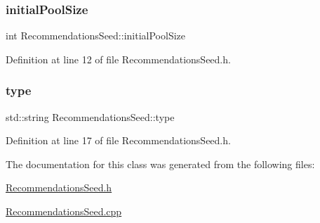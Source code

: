 \mbox{\label{class_recommendations_seed_a15ac2549a6ed64e919e73e520b6cfacb}} 
\subsubsection{\texorpdfstring{initial\+Pool\+Size}{initialPoolSize}}
{\footnotesize\ttfamily int Recommendations\+Seed\+::initial\+Pool\+Size\hspace{0.3cm}{\ttfamily [private]}}



Definition at line 12 of file Recommendations\+Seed.\+h.

\mbox{\label{class_recommendations_seed_a0075ed90bfd92d19ddf32ed0de82c5bf}} 
\subsubsection{\texorpdfstring{type}{type}}
{\footnotesize\ttfamily std\+::string Recommendations\+Seed\+::type\hspace{0.3cm}{\ttfamily [private]}}



Definition at line 17 of file Recommendations\+Seed.\+h.



The documentation for this class was generated from the following files\+:\begin{DoxyCompactItemize}
\item 
\mbox{\hyperlink{_recommendations_seed_8h}{Recommendations\+Seed.\+h}}\item 
\mbox{\hyperlink{_recommendations_seed_8cpp}{Recommendations\+Seed.\+cpp}}\end{DoxyCompactItemize}

